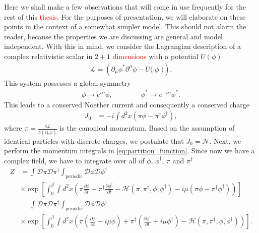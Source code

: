 Here we shall make a few observations that will come in use frequently for the rest of this \textcolor{red}{thesis}. For the purposes of presentation, we will elaborate on these points in the context of a somewhat simpler model. This should not alarm the reader, because the properties we are discussing are \colorbox{red}{ } general and model independent. With this in mind, we consider the Lagrangian description of a complex relativistic scalar in $2+1$ \textcolor{red}{dimensions} with a potential $U(\phi)$
        \begin{align}
            \mathcal{L} = \left(\partial_{\mu}\phi^{*} \partial^{\mu} \phi  - U\big(|\phi|\big)\right).
        \end{align}
        This system possesses a global symmetry 
        \begin{align}
            \phi \rightarrow e^{i \alpha} \phi, \qquad\qquad \phi^* \rightarrow e^{-i \alpha} \phi^*.
        \end{align}
        This leads to a conserved Noether current and consequently a conserved charge
        \begin{align}
            J_{0} &= -i \int d^2x \left( \pi \phi - \pi^{\dag}\phi^{\dag}\right),
        \end{align}
        where $\pi = \frac{\delta \mathcal{L}}{\delta ( \partial_0 \phi)}$ is the canonical momentum. Based on the assumption of identical particles with discrete charges, we postulate that $J_0 = \mathcal{N}$. Next, we perform the momentum integrals in \eqref{eq:partition_function}. Since now we have a complex field, we have to integrate over all of $\phi$, $\phi^{\dag}$, $\pi$ and $\pi^{\dag}$
        \begin{align}
            Z &= \int \mathcal{D} \pi \mathcal{D} \pi^{\dag} \int_{\text{periodic}} \mathcal{D} \phi \mathcal{D} \phi^{\dag} \nonumber \\
            &\times \exp \left[ \int_0^{\beta} \int d^2x \left(\pi \frac{\partial \phi}{\partial t} +\pi^{\dag} \frac{\partial \phi^{\dag}}{\partial t} - \mathcal{H}\left(\pi, \pi^{\dag}, \phi, \phi^{\dag}\right) - i  \mu \left(\pi \phi - \pi^{\dag}\phi^{\dag} \right) \right) \right] \label{eq:partition_function_complex_scalar} \nonumber \\
            &= \int \mathcal{D} \pi \mathcal{D} \pi^{\dag} \int_{\text{periodic}} \mathcal{D} \phi \mathcal{D} \phi^{\dag} \nonumber \\
            &\times \exp \left[ \int_0^{\beta} \int d^2x \left(\pi \left( \frac{\partial \phi}{\partial t} -i \mu \phi \right) +\pi^{\dag} \left( \frac{\partial \phi^{\dag}}{\partial t} +i \mu \phi^{\dag} \right) - \mathcal{H}(\pi, \pi^{\dag}, \phi, \phi^{\dag}) \right) \right]. \label{eq:partition_function_complex_scalar}
        \end{align}
